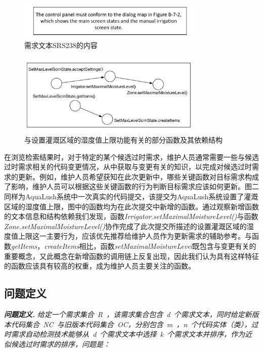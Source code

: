 \begin{figure}[thb]
    \centering
    \includegraphics[width=0.8\textwidth]{./figures/example/SRS238.pdf}
    \caption{需求文本SRS238的内容}
    \label{F:SRS238}
\end{figure}

\begin{figure}[thb]
    \centering
    \includegraphics[width=0.8\textwidth]{./figures/example/setMaximalMoistureLevel.pdf}
    \caption{与设置灌溉区域的湿度值上限功能有关的部分函数及其依赖结构}
    \label{F:SRS238}
\end{figure}

在浏览检索结果时，对于特定的某个候选过时需求，维护人员通常需要一些与候选过时需求相关的代码变更情况，从中获取与变更有关的知识，以完成对候选过时需求的更新。例如，维护人员希望获知在此次更新中，哪些关键函数对目标需求构成了影响，维护人员可以根据这些关键函数的行为判断目标需求应该如何更新。图二同样为AquaLush系统中一次真实的代码提交，该提交为AquaLush系统设置了灌溉区域的湿度值上限，图中的函数均为在此次提交中新增的函数。通过观察新增函数的文本信息和结构依赖我们发现，函数\emph{Irrigator.setMaximalMoistureLevel()}与函数\emph{Zone.setMaximalMoistureLevel()}协作完成了此次提交所描述的设置灌溉区域的湿度值上限这一主要行为，应该优先推荐给维护人员作为更新需求的辅助参考。与函数\emph{getItems}，\emph{createItems}相比，函数\emph{setMaximalMoistureLevel}既包含与变更有关的重要概念，又此概念在新增函数的调用链上反复出现，因此我们认为具有这样特征的函数应该具有较高的权重，成为维护人员主要关注的函数。


\subsection{问题定义}

\textbf{\emph{问题定义.}} \emph{给定一个需求集合~\emph{R}~，该需求集合包含~d~个需求文本，同时给定新版本代码集合~\emph{NC}~与旧版本代码集合~\emph{OC}，分别包含~m~，n~个代码实体（类），过时需求自动检测技术能够从~d~个需求文本中选择~k~个需求文本并排序，作为近似候选过时需求的排序，问题是：}


